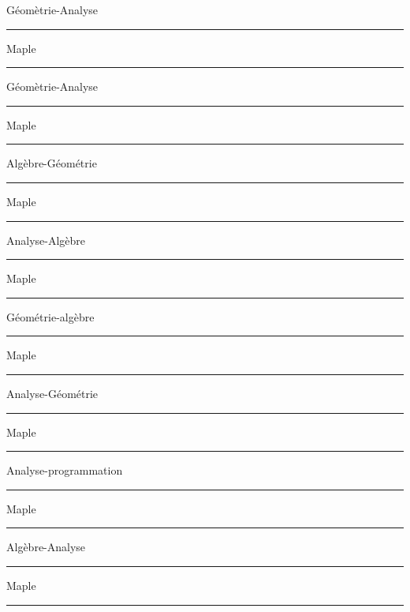 
\centerline{\seventeenbf  G\'eom\`etrie-Analyse}
\hrule

\medskip
\centerline{\twelvebf Maple}
\medskip
{}
\medskip
\hrule
\bigskip
\goodbreak
\vfill




\centerline{\seventeenbf  G\'eom\`etrie-Analyse}
\hrule

\medskip
\centerline{\twelvebf Maple}
\medskip
{}
\medskip
\hrule
\bigskip
\vfill




\centerline{\seventeenbf  Alg\`ebre-G\'eom\'etrie}
\hrule
\medskip
{}
\medskip
\centerline{\twelvebf Maple}
\medskip

\medskip
\hrule


\vfill


\centerline{\seventeenbf  Analyse-Alg\`ebre}
\hrule
\medskip
{}
\medskip
\centerline{\twelvebf Maple}
\medskip

\medskip
\hrule





\bigskip\bigskip

\goodbreak






\centerline{\seventeenbf  G\'eom\'etrie-alg\`ebre}
\hrule
\medskip
{}
\medskip
\centerline{\twelvebf Maple}
\medskip
{}
\medskip
\hrule
\medskip
\vfill

\centerline{\seventeenbf  Analyse-G\'eom\'etrie}
\hrule
\medskip
{}
\medskip
\centerline{\twelvebf Maple}
\medskip
{}
\medskip
\hrule
\medskip
\vfill
\centerline{\seventeenbf  Analyse-programmation}
\hrule
\medskip
{}
\medskip
\centerline{\twelvebf Maple}
\medskip
{}
\medskip
\hrule
\vfill\null
\goodbreak
\null\vfill





\centerline{\seventeenbf  Alg\`ebre-Analyse}
\hrule

\medskip
\centerline{\twelvebf Maple}
\medskip
{}
\medskip
\hrule
\bigskip
\vfill



